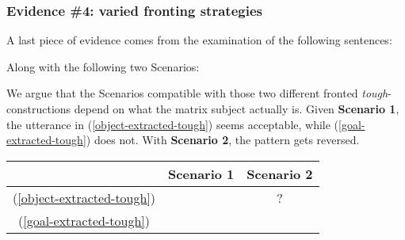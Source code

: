 \documentclass[11pt]{article}
\newcommand{\cmark}{\ding{51}}
\newcommand{\xmark}{\ding{55}}
\begin{document}
\subsubsection{Evidence \#4: varied fronting strategies}\label{ex:fronting-strategies-tough}
A last piece of evidence comes from the examination of the following sentences:
\begin{exe}
	\ex
	\begin{xlist}
		\label{object-extracted-tough}
		\label{goal-extracted-tough}
	\end{xlist}\label{double-object-tough-sc1}
\end{exe}
Along with the following two Scenarios:
\begin{center}
\end{center}
	\begin{center}
\end{center}
We argue that the Scenarios compatible with those two different fronted \textit{tough}-constructions depend on what the matrix subject actually is. Given \textbf{Scenario 1}, the utterance in (\ref{object-extracted-tough}) seems acceptable, while (\ref{goal-extracted-tough}) does not. With \textbf{Scenario 2}, the pattern gets reversed.
\begin{table}[H]
	\centering
	\begin{tabular}{|c|c|c|}
		\hline
		& \textbf{Scenario 1} & \textbf{Scenario 2} \\ \hline
		(\ref{object-extracted-tough}) & \cmark & ? \\
		(\ref{goal-extracted-tough}) & \xmark & \cmark \\ \hline
	\end{tabular}
\end{table}
\end{document}
